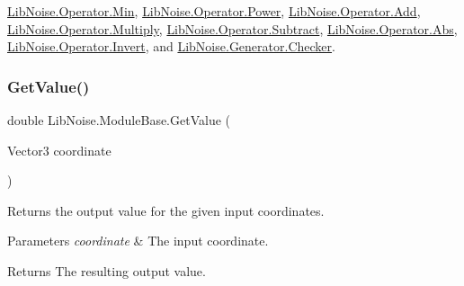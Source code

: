 \hyperlink{class_lib_noise_1_1_operator_1_1_min_a37ad950da95db819e1407d06e0758256}{Lib\+Noise.\+Operator.\+Min}, \hyperlink{class_lib_noise_1_1_operator_1_1_power_a307d65a6817388814f287d90e68ce6f4}{Lib\+Noise.\+Operator.\+Power}, \hyperlink{class_lib_noise_1_1_operator_1_1_add_aa2050ab0e8177b28a092d11b7e4f9163}{Lib\+Noise.\+Operator.\+Add}, \hyperlink{class_lib_noise_1_1_operator_1_1_multiply_ac7f485da38c98500bebdec037abd09ba}{Lib\+Noise.\+Operator.\+Multiply}, \hyperlink{class_lib_noise_1_1_operator_1_1_subtract_af0d3583b9fdbde5da9197c52fbfb6e8c}{Lib\+Noise.\+Operator.\+Subtract}, \hyperlink{class_lib_noise_1_1_operator_1_1_abs_a333592d3dab0c19b2ec6788db66c2948}{Lib\+Noise.\+Operator.\+Abs}, \hyperlink{class_lib_noise_1_1_operator_1_1_invert_ab9127cf738be0293bfb21330357f7646}{Lib\+Noise.\+Operator.\+Invert}, and \hyperlink{class_lib_noise_1_1_generator_1_1_checker_a26a849564ad34925c60be7b4529d4263}{Lib\+Noise.\+Generator.\+Checker}.

\mbox{\label{class_lib_noise_1_1_module_base_aea8b10f91816c21d0910ebf6aa58fde6}} 
\subsubsection{\texorpdfstring{Get\+Value()}{GetValue()}\hspace{0.1cm}{\footnotesize\ttfamily [2/3]}}
{\footnotesize\ttfamily double Lib\+Noise.\+Module\+Base.\+Get\+Value (\begin{DoxyParamCaption}\item[{Vector3}]{coordinate }\end{DoxyParamCaption})}



Returns the output value for the given input coordinates. 


\begin{DoxyParams}{Parameters}
{\em coordinate} & The input coordinate.\\
\hline
\end{DoxyParams}
\begin{DoxyReturn}{Returns}
The resulting output value.
\end{DoxyReturn}
\mbox{\label{class_lib_noise_1_1_module_base_af442fe2cbe675fbebc9c54ec51f6c2ee}} 
